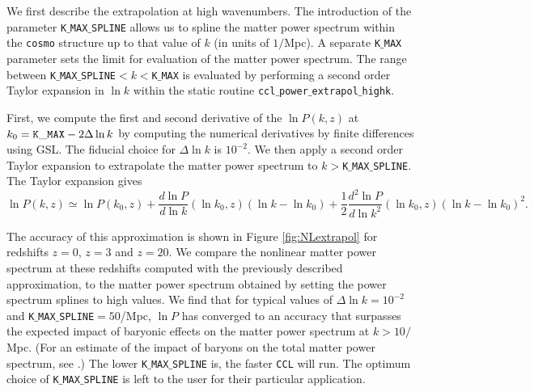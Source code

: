 \documentclass[\docopts]{\docclass}
\newcommand{\ccl}{{\tt CCL}\xspace}
\begin{document}
We first describe the extrapolation at high wavenumbers. The introduction of the parameter {\tt K$\_$MAX$\_$SPLINE} allows us to spline the matter power spectrum within the {\tt cosmo} structure up to that value of $k$ (in units of $1/$Mpc). A separate {\tt K$\_$MAX} parameter sets the limit for evaluation of the matter power spectrum. The range between {\tt K$\_$MAX$\_$SPLINE}$<k<${\tt K$\_$MAX} is evaluated by performing a second order Taylor expansion in $\ln k$ within the static routine {\tt ccl$\_$power$\_$extrapol$\_$highk}.

First, we compute the first and second derivative of the $\ln P(k,z)$ at $k_0={\rm \tt K\_MAX}-2\Delta\ln k$ by computing the numerical derivatives by finite differences using GSL. The fiducial choice for $\Delta\ln k$ is $10^{-2}$. We then apply a second order Taylor expansion to extrapolate the matter power spectrum to $k>${\tt K$\_$MAX$\_$SPLINE}. The Taylor expansion gives
%
\begin{equation}
  \ln P(k,z) \simeq \ln P(k_0,z) + \frac{d\ln P}{d\ln k}(\ln k_0,z) (\ln k-\ln k_0)  + \frac{1}{2}  \frac{d^2\ln P}{d\ln k^2}(\ln k_0,z) (\ln k-\ln k_0)^2.
  \label{eq:NLPSTaylor}
\end{equation}

The accuracy of this approximation is shown in Figure \ref{fig:NLextrapol} for redshifts $z=0$, $z=3$ and $z=20$. We compare the nonlinear matter power spectrum at these redshifts computed with the previously described approximation, to the matter power spectrum obtained by setting the power spectrum splines to high values. We find that for typical values of $\Delta \ln k=10^{-2}$ and {\tt K$\_$MAX$\_$SPLINE}$=50$/Mpc, $\ln P$ has converged to an accuracy that surpasses the expected impact of baryonic effects on the matter power spectrum at $k>10/$Mpc.  (For an estimate of the impact of baryons on the total matter power spectrum, see \citealt{Schneider15}.) The lower {\tt K$\_$MAX$\_$SPLINE} is, the faster \ccl will run. The optimum choice of {\tt K$\_$MAX$\_$SPLINE} is left to the user for their particular application.
\end{document}
